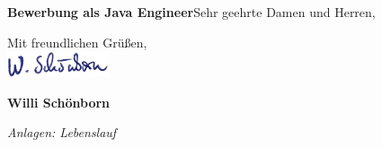 \documentclass[11pt,a4paper,sans]{moderncv} %
\begin{document}


\clearpage

\date{\today} %
\opening{\textbf{Bewerbung als Java Engineer}\newline{}\newline{}Sehr geehrte Damen und Herren,} %
\closing{} %

\makelettertitle %

\lipsum[1-2] %

Mit freundlichen Grüßen,\\[1.5em]
\includegraphics[width=3cm]{pictures/signature}

\bfseries{Willi Schönborn}

\color{color2}\itshape Anlagen: Lebenslauf

\end{document}
